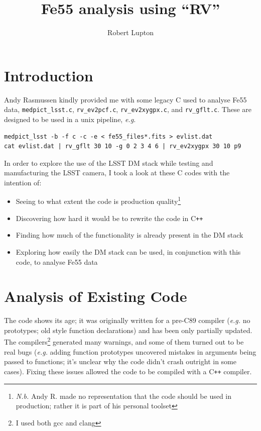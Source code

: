 \documentclass[12pt]{article}
\newcommand{\CPP}{C\texttt{++}\xspace}  %
\begin{document}
\title{Fe55 analysis using ``RV''}
\author{Robert Lupton}
\maketitle

\section{Introduction}

Andy Rasmussen kindly provided me with some legacy C used to analyse Fe55 data,
\texttt{medpict\_lsst.c}, \texttt{rv\_ev2pcf.c}, \texttt{rv\_ev2xygpx.c}, and \texttt{rv\_gflt.c}. These
are designed to be used in a unix pipeline, \textit{e.g.}
\begin{lstlisting}
medpict_lsst -b -f c -c -e < fe55_files*.fits > evlist.dat
cat evlist.dat | rv_gflt 30 10 -g 0 2 3 4 6 | rv_ev2xygpx 30 10 p9
\end{lstlisting}

In order to explore the use of the LSST DM stack while testing and manufacturing the LSST camera,
I took a look at these C codes with the intention of:
\begin{itemize}
  \item Seeing to what extent the code is production quality\footnote{\textit{N.b.} Andy R. made
    no representation that the code should be used in production;  rather it is part of his personal toolset}
  \item Discovering how hard it would be to rewrite the code in \CPP
  \item Finding how much of the functionality is already present in the DM stack
  \item Exploring how easily the DM stack can be used, in conjunction with this code, to analyse Fe55 data
\end{itemize}

\section{Analysis of Existing Code}

The code shows its age;  it was originally written for a pre-C89 compiler (\textit{e.g.} no
prototypes; old style function declarations) and has been only partially updated.
The compilers\footnote{I used both gcc and clang} generated many warnings, and some of them turned out to
be real bugs (\textit{e.g.} adding function prototypes uncovered mistakes in
arguments being passed to functions; it's unclear why the code didn't crash outright in some cases).
Fixing these issues allowed the code to be compiled with a \CPP compiler.
\end{document}

